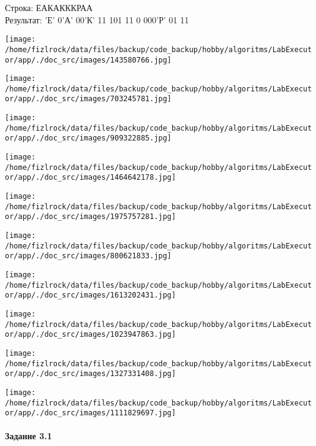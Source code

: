 \documentclass[a4paper, 12pt]{article}
\begin{document}
Строка: 
ЕАКАКККРАА\\
Результат: 'Е' 0'А' 00'К' 11 101 11 0 000'Р' 01 11

\texttt{[image: /home/fizlrock/data/files/backup/code\_backup/hobby/algoritms/LabExecutor/app/./doc\_src/images/143580766.jpg]}

\texttt{[image: /home/fizlrock/data/files/backup/code\_backup/hobby/algoritms/LabExecutor/app/./doc\_src/images/703245781.jpg]}

\texttt{[image: /home/fizlrock/data/files/backup/code\_backup/hobby/algoritms/LabExecutor/app/./doc\_src/images/909322885.jpg]}

\texttt{[image: /home/fizlrock/data/files/backup/code\_backup/hobby/algoritms/LabExecutor/app/./doc\_src/images/1464642178.jpg]}

\texttt{[image: /home/fizlrock/data/files/backup/code\_backup/hobby/algoritms/LabExecutor/app/./doc\_src/images/1975757281.jpg]}

\texttt{[image: /home/fizlrock/data/files/backup/code\_backup/hobby/algoritms/LabExecutor/app/./doc\_src/images/800621833.jpg]}

\texttt{[image: /home/fizlrock/data/files/backup/code\_backup/hobby/algoritms/LabExecutor/app/./doc\_src/images/1613202431.jpg]}

\texttt{[image: /home/fizlrock/data/files/backup/code\_backup/hobby/algoritms/LabExecutor/app/./doc\_src/images/1023947863.jpg]}

\texttt{[image: /home/fizlrock/data/files/backup/code\_backup/hobby/algoritms/LabExecutor/app/./doc\_src/images/1327331408.jpg]}

\texttt{[image: /home/fizlrock/data/files/backup/code\_backup/hobby/algoritms/LabExecutor/app/./doc\_src/images/1111829697.jpg]}
\pagebreak
\paragraph{Задание 3.1}
\end{document}
